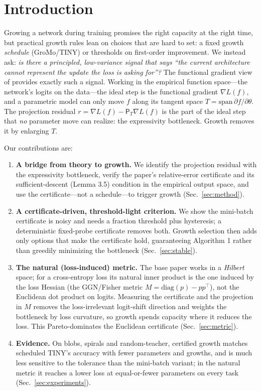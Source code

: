 \documentclass{article}
\newcommand{\grad}{\nabla}
\newcommand{\PT}{\mathsf{P}_{T}}
\begin{document}
\section{Introduction}
Growing a network during training promises the right capacity at the right time,
but practical growth rules lean on choices that are hard to set: a fixed growth
\emph{schedule} (GroMo/TINY) or thresholds on first-order improvement. We instead
ask: \emph{is there a principled, low-variance signal that says ``the current
architecture cannot represent the update the loss is asking for''?} The functional
gradient view of \citet{fgd2025} provides exactly such a signal. Working in the
empirical function space---the network's logits on the data---the ideal step is
the functional gradient $\grad L(f)$, and a parametric model can only move $f$
along its tangent space $T=\mathrm{span}\,\partial f/\partial\theta$. The
projection residual $r=\grad L(f)-\PT\grad L(f)$ is the part of the ideal step
that \emph{no} parameter move can realize: the expressivity bottleneck. Growth
removes it by enlarging $T$.

Our contributions are:
\begin{enumerate}
  \item \textbf{A bridge from theory to growth.} We identify the projection
  residual with the expressivity bottleneck, verify the paper's relative-error
  certificate and its sufficient-descent (Lemma 3.5) condition in the empirical
  output space, and use the certificate---not a schedule---to trigger growth
  (Sec.~\ref{sec:method}).
  \item \textbf{A certificate-driven, threshold-light criterion.} We show the
  mini-batch certificate is noisy and needs a fraction threshold plus hysteresis;
  a deterministic fixed-probe certificate removes both. Growth selection then adds
  only options that make the certificate hold, guaranteeing Algorithm 1 rather
  than greedily minimizing the bottleneck (Sec.~\ref{sec:stable}).
  \item \textbf{The natural (loss-induced) metric.} The base paper works in a
  \emph{Hilbert} space; for a cross-entropy loss its natural inner product is the
  one induced by the loss Hessian (the GGN/Fisher metric $M=\mathrm{diag}(p)-pp^\top$),
  not the Euclidean dot product on logits. Measuring the certificate and the
  projection in $M$ removes the loss-irrelevant logit-shift direction and weights
  the bottleneck by loss curvature, so growth spends capacity where it reduces the
  loss. This Pareto-dominates the Euclidean certificate (Sec.~\ref{sec:metric}).
  \item \textbf{Evidence.} On blobs, spirals and random-teacher, certified growth
  matches scheduled TINY's accuracy with fewer parameters and growths, and is
  much less sensitive to the tolerance than the mini-batch variant; in the natural
  metric it reaches a lower loss at equal-or-fewer parameters on every task
  (Sec.~\ref{sec:experiments}).
\end{enumerate}
\end{document}
